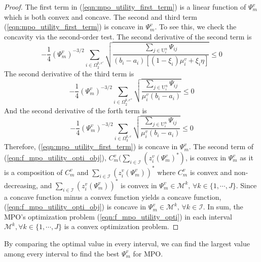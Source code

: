 \documentclass[conference]{IEEEtran}
\begin{document}
\begin{proof}
The first term in (\ref{eqn:mpo_utility_first_term}) is a linear function of $\Psi_m^v$ which is both convex and concave. The second and third term (\ref{eqn:mpo_utility_first_term}) is concave in $\Psi_m^v$. To see this, we check the concavity via the second-order test. The second derivative of the second term is
\begin{equation}
-\frac{1}{4}(\Psi_m^v)^{-3/2}\sum_{i \in \Omega_2^{k,e'}} \sqrt{\frac{\sum_{j \in \mathrm{U}_i^n}\Psi_{ij}}{(b_i-a_i)[(1-\xi_i)\mu_i^v + \xi_i \eta]}} \leq 0
\end{equation}
The second derivative of the third term is
\begin{equation}
-\frac{1}{4}(\Psi_m^v)^{-3/2}\sum_{i \in \Omega_2^{k,e''}} \sqrt{\frac{\sum_{j \in \mathrm{U}_i^n}\Psi_{ij}}{\mu_i^v(b_i-a_i)}} \leq 0
\end{equation}
And the second derivative of the forth term is
\begin{equation}
-\frac{1}{4}(\Psi_m^v)^{-3/2}\sum_{i \in \Omega_3^{k,e}} \sqrt{\frac{\sum_{j \in \mathrm{U}_i^n}\Psi_{ij}}{\mu_i^v(b_i-a_i)}} \leq 0
\end{equation}
Therefore, (\ref{eqn:mpo_utility_first_term}) is concave in $\Psi_m^v$. The second term of (\ref{eqn:f_mpo_utility_opti_obj}), $C_m^v\big(\sum_{i \in \mathcal{I}} (z_{i}^v(\Psi_m^v)^*)$, is convex in $\Psi_m^v$ as it is a composition of $C_m^v$ and $\sum_{i \in \mathcal{I}} (z_{i}^v(\Psi_m^v))^*$ where $C_m^v$ is convex and non-decreasing, and $\sum_{i \in \mathcal{I}} (z_{i}^v(\Psi_m^v))^*$ is convex in $\Psi_m^v \in \mathcal{M}^k,\, \forall k \in \{1, \cdots, J\}$. Since a concave function minus a convex function yields a concave function, (\ref{eqn:f_mpo_utility_opti_obj}) is concave in $\Psi_m^v \in \mathcal{M}^k,\, \forall k \in \mathcal{I}$. In sum, the MPO's optimization problem (\ref{eqn:f_mpo_utility_opti}) in each interval $\mathcal{M}^k, \forall k \in \{1, \cdots, J\}$ is a convex optimization problem. \qedhere
\end{proof}
By comparing the optimal value in every interval, we can find the largest value among every interval to find the best $\Psi_m^v$ for MPO.
\end{document}
